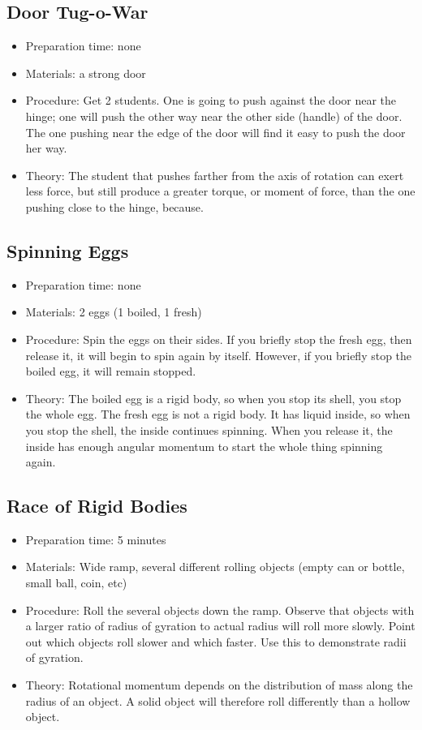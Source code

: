 \subsection{Door Tug-o-War}
\begin{itemize}
\item{Preparation time: none}
\item{Materials: a strong door}
\item{Procedure: Get 2 students. One is going to push against the door near the hinge; one will push the other way near the other side (handle) of the door. The one pushing near the edge of the door will find it easy to push the door her way.}
\item{Theory: The student that pushes farther from the axis of rotation can exert less force, but still produce a greater torque, or moment of force, than the one pushing close to the hinge, because.}
\end{itemize}

\subsection{Spinning Eggs}
\begin{itemize}
\item{Preparation time: none}
\item{Materials: 2 eggs (1 boiled, 1 fresh)}
\item{Procedure: Spin the eggs on their sides. If you briefly stop the fresh egg, then release it, it will begin to spin again by itself. However, if you briefly stop the boiled egg, it will remain stopped.}
\item{Theory: The boiled egg is a rigid body, so when you stop its shell, you stop the whole egg. The fresh egg is not a rigid body. It has liquid inside, so when you stop the shell, the inside continues spinning. When you release it, the inside has enough angular momentum to start the whole thing spinning again.}
\end{itemize}

\subsection{Race of Rigid Bodies}
\begin{itemize}
\item{Preparation time: 5 minutes}
\item{Materials: Wide ramp, several different rolling objects (empty can or bottle, small ball, coin, etc)}
\item{Procedure: Roll the several objects down the ramp. Observe that objects with a larger ratio of radius of gyration to actual radius will roll more slowly. Point out which objects roll slower and which faster. Use this to demonstrate radii of gyration.}
\item{Theory: Rotational momentum depends on the distribution of mass along the radius of an object. A solid object will therefore roll differently than a hollow object.}
\end{itemize}


